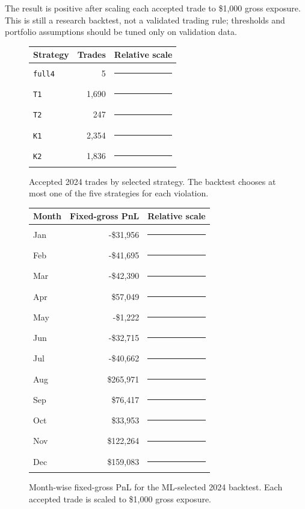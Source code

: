 \documentclass[11pt]{article}
\newcommand{\barrow}[4]{#1 & #2 & \textcolor{#4}{\rule{#3cm}{7pt}}\\}
\begin{document}
The result is positive after scaling each accepted trade to \$1,000 gross exposure. This is still a research backtest, not a validated trading rule; thresholds and portfolio assumptions should be tuned only on validation data.

\begin{figure}[h]
\centering
\begin{tabular}{@{}lrl@{}}
\toprule
Strategy & Trades & Relative scale \\
\midrule
\barrow{\texttt{full4}}{5}{0.1}{blue}
\barrow{\texttt{T1}}{1,690}{7.2}{blue}
\barrow{\texttt{T2}}{247}{1.0}{blue}
\barrow{\texttt{K1}}{2,354}{10.0}{blue}
\barrow{\texttt{K2}}{1,836}{7.8}{blue}
\bottomrule
\end{tabular}
\caption{Accepted 2024 trades by selected strategy. The backtest chooses at most one of the five strategies for each violation.}
\end{figure}

\begin{figure}[h]
\centering
\begin{tabular}{@{}lrl@{}}
\toprule
Month & Fixed-gross PnL & Relative scale \\
\midrule
Jan & -\$31,956 & \textcolor{red}{\rule{1.2cm}{7pt}}\\
Feb & -\$41,695 & \textcolor{red}{\rule{1.6cm}{7pt}}\\
Mar & -\$42,390 & \textcolor{red}{\rule{1.6cm}{7pt}}\\
Apr & \$57,049 & \textcolor{green!50!black}{\rule{2.1cm}{7pt}}\\
May & -\$1,222 & \textcolor{red}{\rule{0.2cm}{7pt}}\\
Jun & -\$32,715 & \textcolor{red}{\rule{1.2cm}{7pt}}\\
Jul & -\$40,662 & \textcolor{red}{\rule{1.5cm}{7pt}}\\
Aug & \$265,971 & \textcolor{green!50!black}{\rule{10.0cm}{7pt}}\\
Sep & \$76,417 & \textcolor{green!50!black}{\rule{2.9cm}{7pt}}\\
Oct & \$33,953 & \textcolor{green!50!black}{\rule{1.3cm}{7pt}}\\
Nov & \$122,264 & \textcolor{green!50!black}{\rule{4.6cm}{7pt}}\\
Dec & \$159,083 & \textcolor{green!50!black}{\rule{6.0cm}{7pt}}\\
\bottomrule
\end{tabular}
\caption{Month-wise fixed-gross PnL for the ML-selected 2024 backtest. Each accepted trade is scaled to \$1,000 gross exposure.}
\end{figure}
\end{document}
